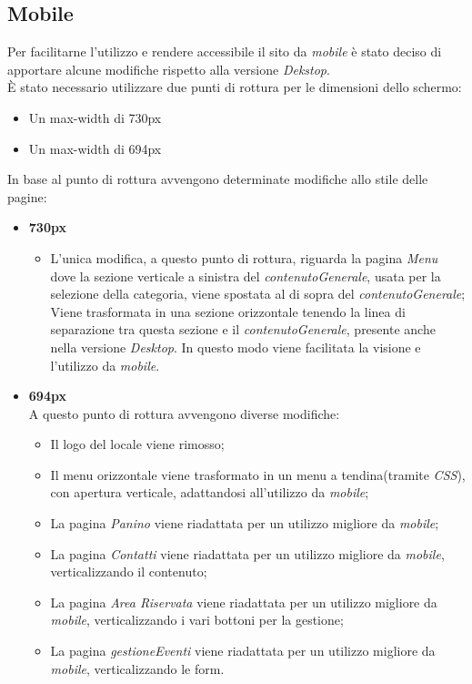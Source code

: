 \subsection{Mobile}
Per facilitarne l'utilizzo e rendere accessibile il sito da \emph{mobile} è stato deciso di apportare alcune modifiche rispetto alla versione \emph{Dekstop}.\\
È stato necessario utilizzare due punti di rottura per le dimensioni dello schermo:
\begin{itemize}
	\item Un max-width di 730px
	\item Un max-width di 694px
\end{itemize}
In base al punto di rottura avvengono determinate modifiche allo stile delle pagine:
\begin{itemize}
	\item \textbf{730px}
	\begin{itemize}
		\item L'unica modifica, a questo punto di rottura, riguarda la pagina \emph{Menu} dove la sezione verticale a sinistra del \emph{contenutoGenerale}, usata per la selezione della categoria, viene spostata al di sopra del \emph{contenutoGenerale};
Viene trasformata in una sezione orizzontale tenendo la linea di separazione tra questa sezione e il \emph{contenutoGenerale}, presente anche nella versione \emph{Desktop}. 
In questo modo viene facilitata la visione e l'utilizzo da \emph{mobile}.
	\end{itemize}
	\item \textbf{694px}\\
	A questo punto di rottura avvengono diverse modifiche:
	\begin{itemize}
		\item Il logo del locale viene rimosso;
		\item Il menu orizzontale viene trasformato in un menu a tendina(tramite \emph{CSS}), con apertura verticale, adattandosi all'utilizzo da \emph{mobile};
		\item La pagina \emph{Panino} viene riadattata per un utilizzo migliore da \emph{mobile};
		\item La pagina \emph{Contatti} viene riadattata per un utilizzo migliore da \emph{mobile}, verticalizzando il contenuto;
		\item La pagina \emph{Area Riservata} viene riadattata per un utilizzo migliore da \emph{mobile}, verticalizzando i vari bottoni per la gestione;
		\item La pagina \emph{gestioneEventi} viene riadattata per un utilizzo migliore da \emph{mobile}, verticalizzando le form.
	\end{itemize}
\end{itemize}